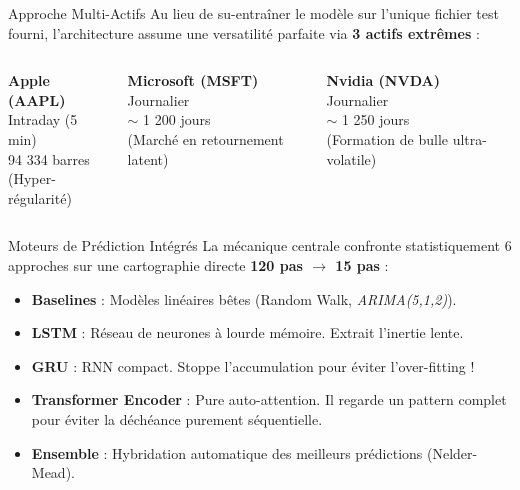 \documentclass[10pt, aspectratio=169]{beamer}
\begin{document}
\begin{frame}{Approche Multi-Actifs}
    Au lieu de su-entraîner le modèle sur l'unique fichier test fourni, l'architecture assume une versatilité parfaite via \textbf{3 actifs extrêmes} :

    \vspace{0.5cm}
    \begin{columns}
        \centering
        \textbf{Apple (AAPL)} \\
        \vspace{0.2cm}
        Intraday (5 min)\\
        94 334 barres\\
        {\small \color{gray}(Hyper-régularité)}

        \centering
        \textbf{Microsoft (MSFT)} \\
        \vspace{0.2cm}
        Journalier\\
        $\sim$ 1 200 jours\\
        {\small \color{gray}(Marché en retournement latent)}

        \centering
        \textbf{Nvidia (NVDA)} \\
        \vspace{0.2cm}
        Journalier\\
        $\sim$ 1 250 jours\\
        {\small \color{gray}(Formation de bulle ultra-volatile)}
    \end{columns}
\end{frame}

\begin{frame}{Moteurs de Prédiction Intégrés}
    La mécanique centrale confronte statistiquement $6$ approches sur une cartographie directe \textbf{120 pas $\rightarrow$ 15 pas} :

    \vspace{0.4cm}
    \begin{itemize}
        \item \textbf{Baselines} : Modèles linéaires bêtes (Random Walk, \textit{ARIMA(5,1,2)}).
        \vspace{0.1cm}
        \item \textbf{LSTM} : Réseau de neurones à lourde mémoire. Extrait l'inertie lente.
        \vspace{0.1cm}
        \item \textbf{GRU} : RNN compact. Stoppe l'accumulation pour éviter l'over-fitting !
        \vspace{0.1cm}
        \item \textbf{Transformer Encoder} : Pure auto-attention. Il regarde un pattern complet pour éviter la déchéance purement séquentielle.
        \vspace{0.1cm}
        \item \textbf{Ensemble} : Hybridation automatique des meilleurs prédictions (Nelder-Mead).
    \end{itemize}
\end{frame}
\end{document}
